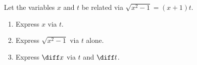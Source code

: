 Let the variables $x$ and $t$ be related via $\sqrt{x^2-1}=(x+1)t$.
\begin{enumerate}[ref={\fcProblemRef}]
\item \label{problemEulerSub-case1-sec(2arctant)-alternative-exposition-x-via-t}  Express $x$ via $t$.
\item \label{problemEulerSub-case1-sec(2arctant)-alternative-exposition-radical-via-t} Express $\sqrt{x^2-1}$ via $t$ alone.
\item Express $\diff x$ via $t$ and $\diff t$.
\end{enumerate}
